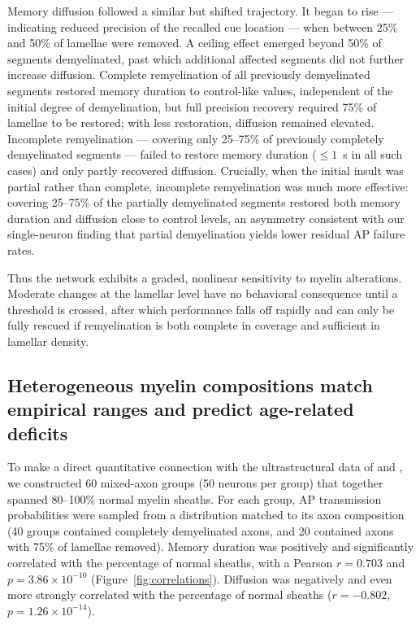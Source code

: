 \documentclass[11pt]{article}
\begin{document}
Memory diffusion followed a similar but shifted trajectory. It began to rise --- indicating reduced precision of the recalled cue location --- when between 25\% and 50\% of lamellae were removed. A ceiling effect emerged beyond 50\% of segments demyelinated, past which additional affected segments did not further increase diffusion. Complete remyelination of all previously demyelinated segments restored memory duration to control-like values, independent of the initial degree of demyelination, but full precision recovery required 75\% of lamellae to be restored; with less restoration, diffusion remained elevated. Incomplete remyelination --- covering only 25--75\% of previously completely demyelinated segments --- failed to restore memory duration ($\leq 1$~s in all such cases) and only partly recovered diffusion. Crucially, when the initial insult was partial rather than complete, incomplete remyelination was much more effective: covering 25--75\% of the partially demyelinated segments restored both memory duration and diffusion close to control levels, an asymmetry consistent with our single-neuron finding that partial demyelination yields lower residual AP failure rates.

Thus the network exhibits a graded, nonlinear sensitivity to myelin alterations. Moderate changes at the lamellar level have no behavioral consequence until a threshold is crossed, after which performance falls off rapidly and can only be fully rescued if remyelination is both complete in coverage and sufficient in lamellar density.

\subsection{Heterogeneous myelin compositions match empirical ranges and predict age-related deficits}

To make a direct quantitative connection with the ultrastructural data of \citet{peters2002aging} and \citet{peters2003remyelination}, we constructed 60 mixed-axon groups (50 neurons per group) that together spanned 80--100\% normal myelin sheaths. For each group, AP transmission probabilities were sampled from a distribution matched to its axon composition (40 groups contained completely demyelinated axons, and 20 contained axons with 75\% of lamellae removed). Memory duration was positively and significantly correlated with the percentage of normal sheaths, with a Pearson $r = 0.703$ and $p = 3.86 \times 10^{-10}$ (Figure~\ref{fig:correlations}). Diffusion was negatively and even more strongly correlated with the percentage of normal sheaths ($r = -0.802$, $p = 1.26 \times 10^{-14}$).
\end{document}
